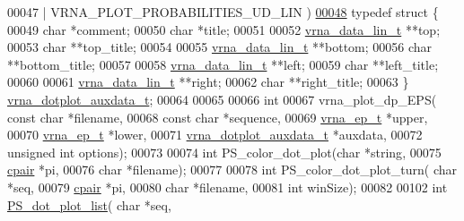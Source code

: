 \begin{DoxyCode}
00047 \textcolor{preprocessor}{                                            | VRNA\_PLOT\_PROBABILITIES\_UD\_LIN )}
\hyperlink{group__plotting__utils}{00048} \textcolor{keyword}{typedef} \textcolor{keyword}{struct }\{
00049   \textcolor{keywordtype}{char}            *comment;
00050   \textcolor{keywordtype}{char}            *title;
00051 
00052   \hyperlink{group__data__structures_structvrna__data__linear__s}{vrna\_data\_lin\_t} **top;
00053   \textcolor{keywordtype}{char}            **top\_title;
00054 
00055   \hyperlink{group__data__structures_structvrna__data__linear__s}{vrna\_data\_lin\_t} **bottom;
00056   \textcolor{keywordtype}{char}            **bottom\_title;
00057 
00058   \hyperlink{group__data__structures_structvrna__data__linear__s}{vrna\_data\_lin\_t} **left;
00059   \textcolor{keywordtype}{char}            **left\_title;
00060 
00061   \hyperlink{group__data__structures_structvrna__data__linear__s}{vrna\_data\_lin\_t} **right;
00062   \textcolor{keywordtype}{char}            **right\_title;
00063 \} \hyperlink{group__plotting__utils_structvrna__dotplot__auxdata__t}{vrna\_dotplot\_auxdata\_t};
00064 
00065 
00066 \textcolor{keywordtype}{int}
00067 vrna\_plot\_dp\_EPS( \textcolor{keyword}{const} \textcolor{keywordtype}{char}              *filename,
00068                   \textcolor{keyword}{const} \textcolor{keywordtype}{char}              *sequence,
00069                   \hyperlink{group__struct__utils__plist_structvrna__elem__prob__s}{vrna\_ep\_t}               *upper,
00070                   \hyperlink{group__struct__utils__plist_structvrna__elem__prob__s}{vrna\_ep\_t}               *lower,
00071                   \hyperlink{group__plotting__utils_structvrna__dotplot__auxdata__t}{vrna\_dotplot\_auxdata\_t}  *auxdata,
00072                   \textcolor{keywordtype}{unsigned} \textcolor{keywordtype}{int}            options);
00073 
00074 \textcolor{keywordtype}{int} PS\_color\_dot\_plot(\textcolor{keywordtype}{char} *\textcolor{keywordtype}{string},
00075                       \hyperlink{group__data__structures_structvrna__cpair__s}{cpair} *pi,
00076                       \textcolor{keywordtype}{char} *filename);
00077 
00078 \textcolor{keywordtype}{int} PS\_color\_dot\_plot\_turn( \textcolor{keywordtype}{char} *seq,
00079                             \hyperlink{group__data__structures_structvrna__cpair__s}{cpair} *pi,
00080                             \textcolor{keywordtype}{char} *filename,
00081                             \textcolor{keywordtype}{int} winSize);
00082 
00102 \textcolor{keywordtype}{int} \hyperlink{group__plotting__utils_ga00ea223b5cf02eb2faae5ff29f0d5e12}{PS\_dot\_plot\_list}( \textcolor{keywordtype}{char} *seq,

\end{DoxyCode}
